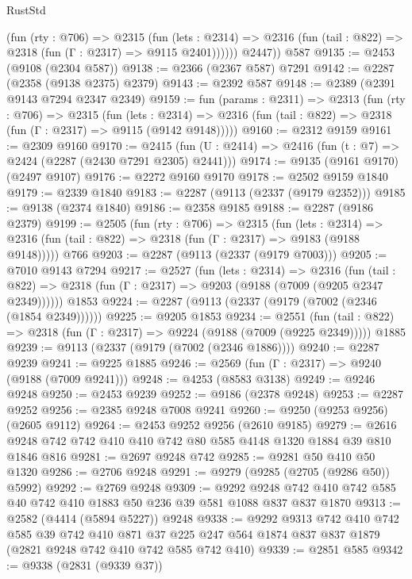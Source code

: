 \begin{lexlean}{RustStd}
\begin{coremodule}
            (fun (rty : @706) =>
            @2315
              (fun (lets : @2314) =>
              @2316 (fun (tail : @822) => @2318 (fun (Γ : @2317) => @9115 @2401))))))
        @2447))
    @587
@9135 := @2453 (@9108 (@2304 @587))
@9138 := @2366 (@2367 @587) @7291
@9142 := @2287 (@2358 (@9138 @2375) @2379)
@9143 := @2392 @587
@9148 := @2389 (@2391 @9143 @7294 @2347 @2349)
@9159 := fun (params : @2311) =>
  @2313
    (fun (rty : @706) =>
    @2315
      (fun (lets : @2314) =>
      @2316 (fun (tail : @822) => @2318 (fun (Γ : @2317) => @9115 (@9142 @9148)))))
@9160 := @2312 @9159
@9161 := @2309 @9160
@9170 := @2415 (fun (U : @2414) => @2416 (fun (t : @7) => @2424 (@2287 (@2430 @7291 @2305) @2441)))
@9174 := @9135 (@9161 @9170) (@2497 @9107)
@9176 := @2272 @9160 @9170
@9178 := @2502 @9159 @1840
@9179 := @2339 @1840
@9183 := @2287 (@9113 (@2337 (@9179 @2352)))
@9185 := @9138 (@2374 @1840)
@9186 := @2358 @9185
@9188 := @2287 (@9186 @2379)
@9199 := @2505
    (fun (rty : @706) =>
    @2315
      (fun (lets : @2314) =>
      @2316 (fun (tail : @822) => @2318 (fun (Γ : @2317) => @9183 (@9188 @9148)))))
    @766
@9203 := @2287 (@9113 (@2337 (@9179 @7003)))
@9205 := @7010 @9143 @7294
@9217 := @2527
    (fun (lets : @2314) =>
    @2316
      (fun (tail : @822) => @2318 (fun (Γ : @2317) => @9203 (@9188 (@7009 (@9205 @2347 @2349))))))
    @1853
@9224 := @2287 (@9113 (@2337 (@9179 (@7002 (@2346 (@1854 @2349))))))
@9225 := @9205 @1853
@9234 := @2551
    (fun (tail : @822) => @2318 (fun (Γ : @2317) => @9224 (@9188 (@7009 (@9225 @2349)))))
    @1885
@9239 := @9113 (@2337 (@9179 (@7002 (@2346 @1886))))
@9240 := @2287 @9239
@9241 := @9225 @1885
@9246 := @2569 (fun (Γ : @2317) => @9240 (@9188 (@7009 @9241)))
@9248 := @4253 (@8583 @3138)
@9249 := @9246 @9248
@9250 := @2453 @9239
@9252 := @9186 (@2378 @9248)
@9253 := @2287 @9252
@9256 := @2385 @9248 @7008 @9241
@9260 := @9250 (@9253 @9256) (@2605 @9112)
@9264 := @2453 @9252 @9256 (@2610 @9185)
@9279 := @2616 @9248 @742 @742 @410 @410 @742 @80 @585 @4148 @1320 @1884 @39 @810 @1846 @816
@9281 := @2697 @9248 @742
@9285 := @9281 @50 @410 @50 @1320
@9286 := @2706 @9248
@9291 := @9279 (@9285 (@2705 (@9286 @50)) @5992)
@9292 := @2769 @9248
@9309 := @9292 @9248 @742 @410 @742 @585 @40 @742 @410 @1883 @50 @236 @39 @581 @1088 @837 @837 @1870
@9313 := @2582 (@4414 (@5894 @5227)) @9248
@9338 := @9292
    @9313
    @742
    @410
    @742
    @585
    @39
    @742
    @410
    @871
    @37
    @225
    @247
    @564
    @1874
    @837
    @837
    @1879
    (@2821 @9248 @742 @410 @742 @585 @742 @410)
@9339 := @2851 @585
@9342 := @9338 (@2831 (@9339 @37))

\end{coremodule}
\end{lexlean}

